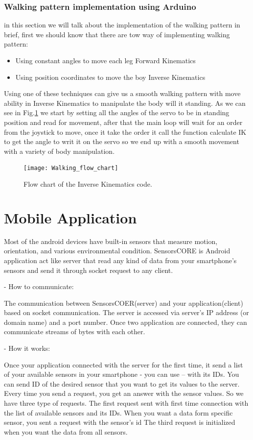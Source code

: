 		
		\subsubsection{Walking pattern implementation using Arduino} 
		in this section we will talk about the implementation of the walking pattern in brief, first we should know that there are tow way of implementing walking pattern:
		\begin{itemize}
			\item Using constant angles to move each leg {Forward Kinematics}
			\item Using position coordinates to move the boy {Inverse Kinematics}
		\end{itemize} 
		Using one of these techniques can give us a smooth walking pattern with move ability in Inverse Kinematics to manipulate the body will it standing.
		As we can see in Fig.\ref{Fig:flowcahrt} we start by setting all the angles of the servo to be in standing position and read for movement, after that the main loop will wait for an order from the joystick to move, once it take the order it call the function calculate IK to get the angle to writ it on the servo so we end up with a smooth movement with a variety of body manipulation.
		\begin{figure}[H]		
			\centering
			\texttt{[image: Walking\_flow\_chart]}
			\caption{Flow chart of the Inverse Kinematics code.}
			\label{Fig:flowcahrt}
		\end{figure}
\section{Mobile Application}

	Most of the android devices have built-in sensors that measure motion, orientation, and various environmental condition.
	SensorsCORE is Android application act like server that read any kind of data from your smartphone's sensors and send it through socket request to any client.  
	
	- How to communicate: 
	
	The communication between SensorsCOER(server) and your application(client) based on socket communication. The server is accessed via server's IP address (or domain name) and a port number. Once two application are connected, they can communicate streams of bytes with each other.  
	
	- How it works: 
	
	Once your application connected with the server for the first time, it send a list of your available sensors in your smartphone - you can use – with its IDs. You can send ID of the desired sensor that you want to get its values to the server. Every time you send a request, you get an answer with the sensor values. So we have three type of requests. 
	The first request sent with first time connection with the list of available sensors and its IDs. 
	When you want a data form specific sensor, you sent a request with the sensor's id The third request is initialized when you want the data from all sensors. 

